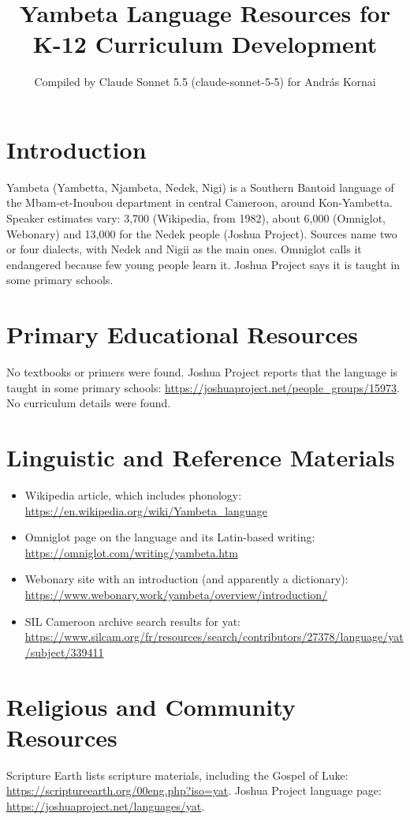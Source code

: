 \documentclass[12pt]{article}
\title{Yambeta Language Resources for K-12 Curriculum Development}
\author{Compiled by Claude Sonnet 5.5 (claude-sonnet-5-5) for Andr\'as Kornai}
\date{}
\begin{document}
\maketitle

\section{Introduction}
Yambeta (Yambetta, Njambeta, Nedek, Nigi) is a Southern Bantoid language of the Mbam-et-Inoubou department in central Cameroon, around Kon-Yambetta. Speaker estimates vary: 3,700 (Wikipedia, from 1982), about 6,000 (Omniglot, Webonary) and 13,000 for the Nedek people (Joshua Project). Sources name two or four dialects, with Nedek and Nigii as the main ones. Omniglot calls it endangered because few young people learn it. Joshua Project says it is taught in some primary schools.

\section{Primary Educational Resources}
No textbooks or primers were found. Joshua Project reports that the language is taught in some primary schools: \url{https://joshuaproject.net/people_groups/15973}. No curriculum details were found.

\section{Linguistic and Reference Materials}
\begin{itemize}
\item Wikipedia article, which includes phonology: \url{https://en.wikipedia.org/wiki/Yambeta_language}
\item Omniglot page on the language and its Latin-based writing: \url{https://omniglot.com/writing/yambeta.htm}
\item Webonary site with an introduction (and apparently a dictionary): \url{https://www.webonary.work/yambeta/overview/introduction/}
\item SIL Cameroon archive search results for yat: \url{https://www.silcam.org/fr/resources/search/contributors/27378/language/yat/subject/339411}
\end{itemize}

\section{Religious and Community Resources}
Scripture Earth lists scripture materials, including the Gospel of Luke: \url{https://scriptureearth.org/00eng.php?iso=yat}. Joshua Project language page: \url{https://joshuaproject.net/languages/yat}.
\end{document}
